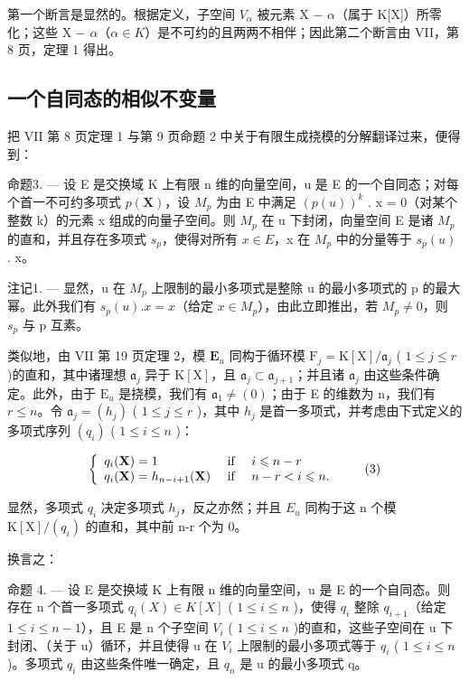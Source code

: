 第一个断言是显然的。根据定义，子空间 \(V_{\alpha}\) 被元素 X − \(\alpha\)（属于 K{[}X{]}）所零化；这些 X − \(\alpha\)（\(\alpha \in K\)）是不可约的且两两不相伴；因此第二个断言由 VII，第 8 页，定理 1 得出。

\subsection{一个自同态的相似不变量}

把 VII 第 8 页定理 1 与第 9 页命题 2 中关于有限生成挠模的分解翻译过来，便得到：

命题3. --- 设 E 是交换域 K 上有限 n 维的向量空间，u 是 E 的一个自同态；对每个首一不可约多项式 \(p(\mathbf{X})\)，设 \(M_{p}\) 为由 E 中满足 \((p(u))^{k}\) . x = 0（对某个整数 k）的元素 x 组成的向量子空间。则 \(M_{p}\) 在 u 下封闭，向量空间 E 是诸 \(M_{p}\) 的直和，并且存在多项式 \(s_{p}\)，使得对所有 \(x \in E\)，x 在 \(M_{p}\) 中的分量等于 \(s_{p}(u)\) . x。

注记1. --- 显然，u 在 \(M_{p}\) 上限制的最小多项式是整除 u 的最小多项式的 p 的最大幂。此外我们有 \(s_{p}(u).x = x\)（给定 \(x \in M_{p}\)），由此立即推出，若 \(M_{p} \neq 0\)，则 \(s_{p}\) 与 p 互素。

类似地，由 VII 第 19 页定理 2，模 \(\mathbf{E}_u\) 同构于循环模 \(\mathrm{F}_j = \mathrm{K}[\mathrm{X}] / \mathfrak{a}_j\) ( \(1 \leqslant j \leqslant r\) )的直和，其中诸理想 \(\mathfrak{a}_j\) 异于 \(\mathrm{K}[\mathrm{X}]\)，且 \(\mathfrak{a}_j \subset \mathfrak{a}_{j+1}\)；并且诸 \(\mathfrak{a}_j\) 由这些条件确定。此外，由于 \(\mathrm{E}_u\) 是挠模，我们有 \(\mathfrak{a}_1 \neq (0)\)；由于 E 的维数为 n，我们有 \(r \leqslant n\)。令 \(\mathfrak{a}_j = (h_j)\) ( \(1 \leqslant j \leqslant r\) )，其中 \(h_j\) 是首一多项式，并考虑由下式定义的多项式序列 \((q_i)\) ( \(1 \leqslant i \leqslant n\) )：

\[
\left\{ \begin{array}{l l} q _ {i} (\mathbf {X}) = 1 & \text { if } \quad i \leqslant n - r \\ q _ {i} (\mathbf {X}) = h _ {n - i + 1} (\mathbf {X}) & \text { if } \quad n - r <   i \leqslant n. \end{array} \right.\tag{3}
\]

显然，多项式 \(q_{i}\) 决定多项式 \(h_{j}\)，反之亦然；并且 \(E_{u}\) 同构于这 n 个模 \(\mathrm{K}[\mathrm{X}]/(q_{i})\) 的直和，其中前 n-r 个为 0。

换言之：

命题 4. --- 设 E 是交换域 K 上有限 n 维的向量空间，u 是 E 的一个自同态。则存在 n 个首一多项式 \(q_{i}(X) \in K[X]\) ( \(1 \leqslant i \leqslant n\) )，使得 \(q_{i}\) 整除 \(q_{i+1}\)（给定 \(1 \leqslant i \leqslant n-1\)），且 E 是 n 个子空间 \(V_{i}\) ( \(1 \leqslant i \leqslant n\) )的直和，这些子空间在 u 下封闭、（关于 u）循环，并且使得 u 在 \(V_{i}\) 上限制的最小多项式等于 \(q_{i}\) ( \(1 \leqslant i \leqslant n\) )。多项式 \(q_{i}\) 由这些条件唯一确定，且 \(q_{n}\) 是 u 的最小多项式 q。

